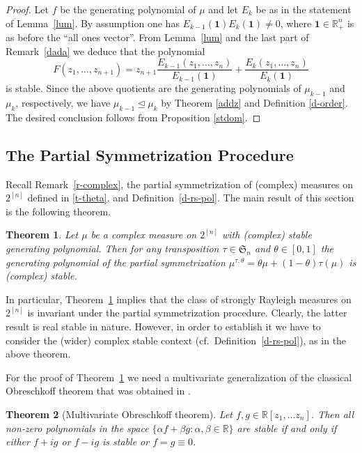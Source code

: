 \documentclass[10pt,reqno]{amsart}
\theoremstyle{plain}
\newtheorem{theorem}{Theorem}[section]
\theoremstyle{definition}
\theoremstyle{remark}
\newcommand{\RR}{\mathbb{R}}
\newcommand{\ben}{\mathbf{1}}
\newcommand{\fS}{\mathfrak{S}}
\begin{document}
\begin{proof}
Let $f$ be the generating polynomial of $\mu$ and let $E_k$ be as in the 
statement of Lemma~\ref{lum}. By assumption one has 
$E_{k-1}(\ben)E_k(\ben)\neq 0$, where $\ben\in\RR_+^n$ 
is as before the ``all ones 
vector''. From Lemma~\ref{lum} and the last part of Remark~\ref{dada} 
we deduce that the polynomial 
$$
F(z_1,\ldots,z_{n+1})=z_{n+1}
\frac{E_{k-1}(z_1,\ldots, z_n)}{E_{k-1}(\ben)} + 
\frac {E_{k}(z_1,\ldots, z_n)}{E_{k}(\ben)} 
$$
is stable. Since the above quotients are the generating polynomials
of $\mu_{k-1}$ and $\mu_k$, respectively, we have $\mu_{k-1} \unlhd \mu_k$ 
by Theorem \ref{addz} and Definition \ref{d-order}. The desired 
conclusion follows from Proposition \ref{stdom}. 
\end{proof}

\subsection{The Partial Symmetrization Procedure}\label{n-s5}

Recall Remark~\ref{r-complex}, the partial 
symmetrization
of (complex) measures on $2^{[n]}$ defined in \eqref{t-theta}, and
Definition~\ref{d-rs-pol}. The main 
result of this section is the following theorem. 

\begin{theorem}\label{asym}
Let $\mu$ be a complex measure on $2^{[n]}$ with 
(complex) stable generating polynomial. Then for any  
transposition $\tau\in\fS_n$ and $\theta\in[0,1]$ the generating polynomial of
the partial symmetrization 
$\mu^{\tau,\theta}=\theta\mu+(1-\theta)\tau(\mu)$ is (complex) stable.
\end{theorem}


In particular, Theorem~\ref{asym} implies that the class of strongly
Rayleigh measures on $2^{[n]}$ is invariant under the partial symmetrization
procedure. Clearly, the latter result is real stable in nature. However, in 
order
to establish it we have to consider the (wider) complex stable context 
(cf.~Definition~\ref{d-rs-pol}), as in the above theorem. 

For the proof of Theorem~\ref{asym}
we need a multivariate generalization of the classical 
Obreschkoff theorem that was obtained in \cite{BBS2}. 

\begin{theorem}[Multivariate Obreschkoff theorem]
Let $f,g \in \RR[z_1, \ldots z_n]$. Then all non-zero polynomials in the space 
$
\{\alpha f + \beta g: \alpha, \beta \in \RR\}
$
are stable if and only if either $f +ig$ or $f-ig$ is stable or $f=g\equiv 0$. 
\end{theorem}
\end{document}
